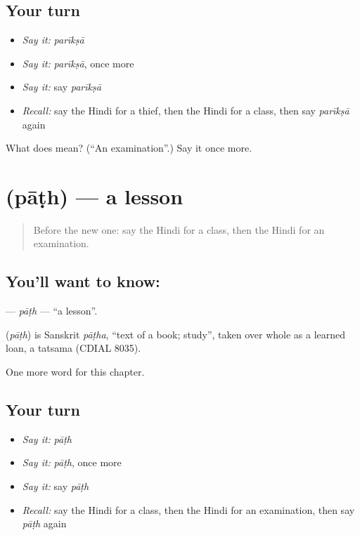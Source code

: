 \subsection*{Your turn}
\begin{itemize}
\raggedright
  \item \emph{Say it:} \emph{parīkṣā}
  \item \emph{Say it:} \emph{parīkṣā}, once more
  \item \emph{Say it:} say \emph{parīkṣā}
  \item \emph{Recall:} say the Hindi for a thief, then the Hindi for a class, then say \emph{parīkṣā} again
\end{itemize}

\begin{tcolorbox}[breakable,colback=teal!4,colframe=teal!35!black,title={Before you move on}]
What does  mean? (\textquotedblleft{}An examination\textquotedblright{}.) Say it once more.
\end{tcolorbox}
\section[\texorpdfstring{\hi{पाठ} (pāṭh)}{पाठ (pāṭh)}]{ (pāṭh) — a lesson}

\label{lesson:HI-C197-path}



\begin{quote}
Before the new one: say the Hindi for a class, then the Hindi for an examination.
\end{quote}

\subsection*{You'll want to know: }
\textbf{} — \emph{pāṭh} — \textquotedblleft{}a lesson\textquotedblright{}.

\begin{cousinweb}
\textbf{} (\emph{pāṭh}) is Sanskrit \emph{pāṭha}, \textquotedblleft{}text of a book; study\textquotedblright{}, taken over whole as a learned loan, a tatsama (CDIAL 8035).
\end{cousinweb}

\begin{grammarlens}[title={What you've built}]
One more word for this chapter.
\end{grammarlens}

\subsection*{Your turn}
\begin{itemize}
\raggedright
  \item \emph{Say it:} \emph{pāṭh}
  \item \emph{Say it:} \emph{pāṭh}, once more
  \item \emph{Say it:} say \emph{pāṭh}
  \item \emph{Recall:} say the Hindi for a class, then the Hindi for an examination, then say \emph{pāṭh} again
\end{itemize}

